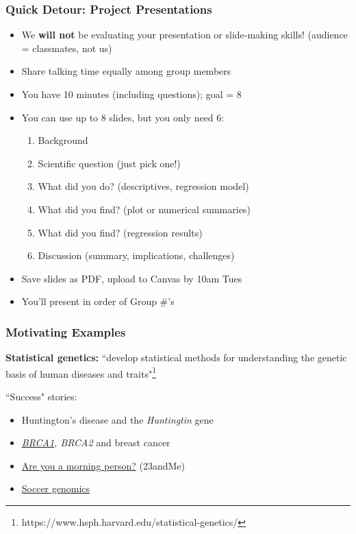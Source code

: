 \documentclass[12pt, 
hyperref={colorlinks=true, linkcolor=blue, urlcolor=cyan},dvipsnames]{beamer}
\begin{document}
\begin{frame}
\frametitle{Quick Detour: Project Presentations}

\begin{itemize}
\item We \textbf{will not} be evaluating your presentation or slide-making skills! (audience = classmates, not us)
\item Share talking time equally among group members
\item You have 10 minutes (including questions); goal = 8
\item You can use up to 8 slides, but you only need 6:
	\begin{enumerate}
	\item Background
	\item Scientific question (just pick one!)
	\item What did you do? (descriptives, regression model)
	\item What did you find? (plot or numerical summaries)
	\item What did you find? (regression results)
	\item Discussion (summary, implications, challenges)
	\end{enumerate}
\item Save slides as PDF, upload to Canvas by 10am Tues
\item You'll present in order of Group \#'s 
\end{itemize}

\end{frame}

\begin{frame}
\frametitle{Motivating Examples}

\textbf{Statistical genetics:} ``develop statistical methods for understanding the genetic basis of human diseases and traits"\footnote[frame]{https://www.hsph.harvard.edu/statistical-genetics/} \pause

``Success" stories:\vspace{-0.3cm} 
\begin{itemize}
\item Huntington's disease and the \textit{Huntingtin} gene \pause
\item \textit{\href{https://www.nytimes.com/2013/05/14/opinion/my-medical-choice.html}{BRCA1}, BRCA2} and breast cancer \pause
\item \href{https://www.nature.com/articles/ncomms10448}{Are you a morning person?} (23andMe) \pause
\item \href{https://www.soccergenomics.com/}{Soccer genomics}
\end{itemize}
\end{frame}
\end{document}
